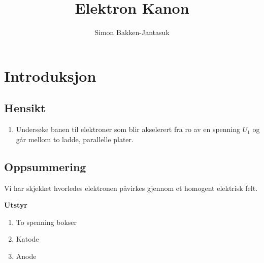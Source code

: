\documentclass[a4paper]{article}
\title{Elektron Kanon}
\author{Simon Bakken-Jantasuk}
\begin{document}
\maketitle

\tableofcontents

\listoffigures

\listoftables

\pagebreak

\section{Introduksjon} %
\label{sec:introduksjon}
\subsection{Hensikt} %
\label{sub:hensikt}
\begin{flushleft}
	\begin{enumerate}
		\item Undersøke banen til elektroner som blir akselerert fra ro av en spenning $U_1$ og går mellom to ladde, parallelle plater.
	\end{enumerate}
\end{flushleft}
\subsection{Oppsummering} %
\label{sub:oppsummering}
\begin{flushleft}
	Vi har skjekket hvorledes elektronen påvirkes gjennom et homogent elektrisk felt.
\end{flushleft}

\textbf{Utstyr} 
\begin{enumerate}
	\item To spenning bokser
	\item  Katode
	\item Anode
\end{enumerate}
\end{document}

